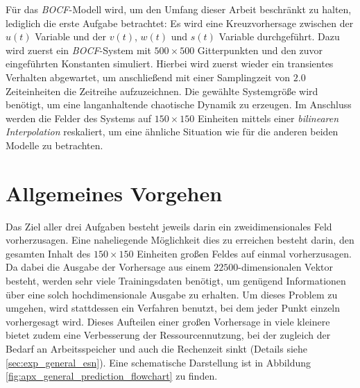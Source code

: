 Für das \textit{BOCF}-Modell wird, um den Umfang dieser Arbeit beschränkt zu halten, lediglich die erste Aufgabe betrachtet: Es wird eine Kreuzvorhersage zwischen der $u(t)$ Variable und der $v(t)$, $w(t)$ und $s(t)$ Variable durchgeführt. Dazu wird zuerst ein \textit{BOCF}-System mit $500 \times 500$ Gitterpunkten und den zuvor eingeführten Konstanten simuliert. Hierbei wird zuerst wieder ein transientes Verhalten abgewartet, um anschließend mit einer Samplingzeit von $2.0$ Zeiteinheiten die Zeitreihe aufzuzeichnen. Die gewählte Systemgröße wird benötigt, um eine langanhaltende chaotische Dynamik zu erzeugen. Im Anschluss werden die Felder des Systems auf $150 \times 150$ Einheiten mittels einer \textit{bilinearen Interpolation} reskaliert, um eine ähnliche Situation wie für die anderen beiden Modelle zu betrachten. 

\section{Allgemeines Vorgehen}
\label{sc:experiments_general}
Das Ziel aller drei Aufgaben besteht jeweils darin ein zweidimensionales Feld vorherzusagen. Eine naheliegende Möglichkeit dies zu erreichen besteht darin, den gesamten Inhalt des $150 \times 150$ Einheiten großen Feldes auf einmal vorherzusagen. Da dabei die Ausgabe der Vorhersage aus einem $22500$-dimensionalen Vektor besteht, werden sehr viele Trainingsdaten benötigt, um genügend Informationen über eine solch hochdimensionale Ausgabe zu erhalten. Um dieses Problem zu umgehen, wird stattdessen ein Verfahren benutzt, bei dem jeder Punkt einzeln vorhergesagt wird. Dieses Aufteilen einer großen Vorhersage in viele kleinere bietet zudem eine Verbesserung der Ressourcennutzung, bei der zugleich der Bedarf an Arbeitsspeicher und auch die Rechenzeit sinkt (Details siehe \ref{sec:exp_general_esn}). Eine schematische Darstellung ist in Abbildung \ref{fig:apx_general_prediction_flowchart} zu finden.\\

